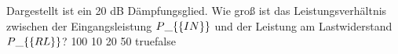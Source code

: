     {Dargestellt ist ein 20 dB Dämpfungsglied. Wie groß ist das Leistungsverhältnis zwischen der Eingangsleistung $P\_\{\textrm\{IN\}\}$ und der Leistung am Lastwiderstand $P\_\{\textrm\{RL\}\}$?}
    {100}
    {10}
    {20}
    {50}
    {true}{false}